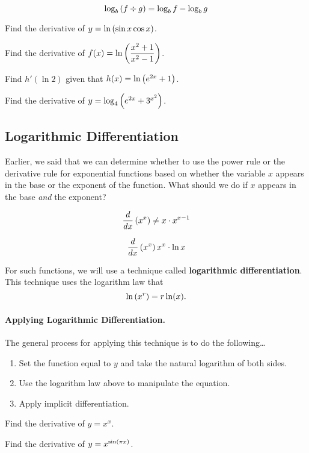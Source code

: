 \documentclass[12pt]{article}
\begin{document}
$$\log_b\left( f\div g\right) = \log_b f-\log_b g$$

\vspace{3mm}

\Example Find the derivative of $y=\ln\left(\sin x\cos x\right)$.

\vspace{45mm}

\Example Find the derivative of $f(x)=\ln\left(\displaystyle\frac{x^2+1}{x^2-1}\right)$.

\vspace{45mm}

\Example Find $h'(\ln 2)$ given that $h(x)=\ln\left( e^{2x}+1\right)$.

\newpage

\Example Find the derivative of $y=\log_4\left( e^{2x}+3^{x^2}\right)$.

\vspace{50mm}

\subsection*{Logarithmic Differentiation}

Earlier, we said that we can determine whether to use the power rule or the derivative rule for exponential functions based on whether the variable $x$ appears in the base or the exponent of the function. What should we do if $x$ appears in the base \textit{and} the exponent?

$$\frac{d}{dx}\left( x^x\right) \neq x\cdot x^{x-1}$$

$$\frac{d}{dx}\left( x^x\right) x^x\cdot \ln x$$

\vspace{3mm}

For such functions, we will use a technique called \textbf{logarithmic differentiation}. This technique uses the logarithm law that
$$\ln\left( x^r\right)=r\ln (x).$$

\vspace{5mm}

\paragraph{Applying Logarithmic Differentiation.} The general process for applying this technique is to do the following\dots
\begin{enumerate}
	\item[\tc{1}] Set the function equal to $y$ and take the natural logarithm of both sides.
	\item[\tc{2}] Use the logarithm law above to manipulate the equation.
	\item[\tc{3}] Apply implicit differentiation.
\end{enumerate}

\newpage

\Example Find the derivative of $y=x^x$.

\vspace{100mm}

\Example Find the derivative of $y=x^{\sin\left( \pi x\right)}$.
\end{document}

